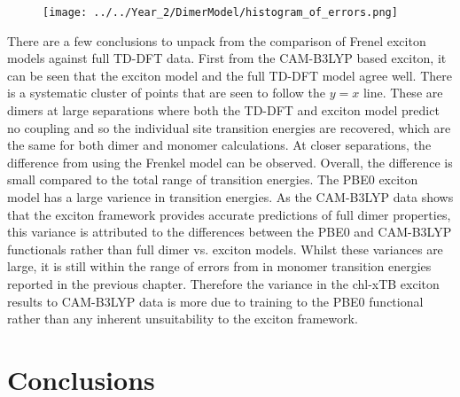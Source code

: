 \begin{figure}
    \texttt{[image: ../../Year\_2/DimerModel/histogram\_of\_errors.png]}
\end{figure}

There are a few conclusions to unpack from the comparison of Frenel exciton models
against full TD-DFT data. First from the CAM-B3LYP based exciton, it can be seen
that the exciton model and the full TD-DFT model agree well. There is a systematic
cluster of points that are seen to follow the $y=x$ line. These are dimers at large
separations where both the TD-DFT and exciton model predict no coupling and so
the individual site transition energies are recovered, which are the same for both
dimer and monomer calculations. At closer separations, the difference from using
the Frenkel model can be observed. Overall, the difference is small compared to 
the total range of transition energies.
The PBE0 exciton model has a large varience in transition energies. As the CAM-B3LYP
data shows that the exciton framework provides accurate predictions of full dimer
properties, this variance is attributed to the differences between the PBE0 and 
CAM-B3LYP functionals rather than full dimer vs. exciton models. Whilst these variances
are large, it is still within the range of errors from in monomer transition energies
reported in the previous chapter.
Therefore the variance in the chl-xTB exciton results to CAM-B3LYP data is more
due to training to the PBE0 functional rather than any inherent unsuitability to
the exciton framework.

\section{Conclusions}